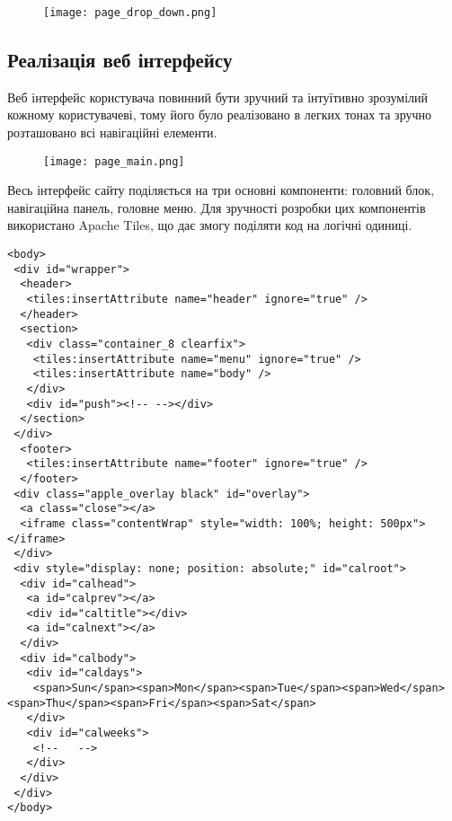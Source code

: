 \begin{figure}[!ht]
\centering
    \texttt{[image: page\_drop\_down.png]}
    \label{pic:page_drop_down}
\end{figure}


\subsection{Реалізація веб інтерфейсу}
\par Веб інтерфейс користувача повинний бути зручний та інтуїтивно зрозумілий кожному користувачеві, тому його було реалізовано в легких тонах та зручно розташовано всі навігаційні елементи.

\begin{figure}[!ht]
\centering
		\texttt{[image: page\_main.png]}
		\label{pic:page_main}
\end{figure}
\par Весь інтерфейс сайту поділяється на три основні компоненти: головний блок, навігаційна панель, головне меню. Для зручності розробки цих компонентів використано Apache Tiles, що дає змогу поділяти код на логічні одиниці.
\begin{lstlisting}
<body>
 <div id="wrapper">
  <header>
   <tiles:insertAttribute name="header" ignore="true" />
  </header>
  <section>
   <div class="container_8 clearfix">
    <tiles:insertAttribute name="menu" ignore="true" />
    <tiles:insertAttribute name="body" />
   </div>
   <div id="push"><!-- --></div>
  </section>
 </div>
  <footer>
   <tiles:insertAttribute name="footer" ignore="true" />
  </footer>
 <div class="apple_overlay black" id="overlay">
  <a class="close"></a>
  <iframe class="contentWrap" style="width: 100%; height: 500px"></iframe>
 </div>
 <div style="display: none; position: absolute;" id="calroot">
  <div id="calhead">
   <a id="calprev"></a>
   <div id="caltitle"></div>
   <a id="calnext"></a>
  </div>
  <div id="calbody">
   <div id="caldays">
    <span>Sun</span><span>Mon</span><span>Tue</span><span>Wed</span><span>Thu</span><span>Fri</span><span>Sat</span>
   </div>
   <div id="calweeks">
    <!--   -->
   </div>
  </div>
 </div>
</body>
\end{lstlisting}




